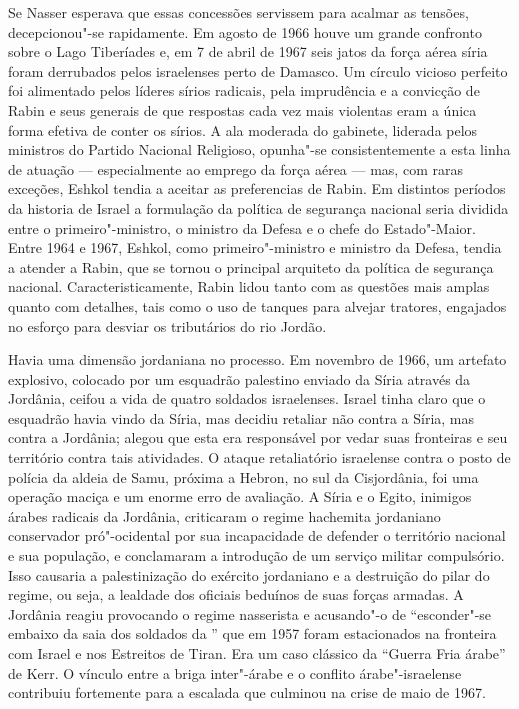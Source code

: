 Se Nasser esperava que essas concessões servissem para acalmar as
tensões, decepcionou"-se rapidamente. Em agosto de 1966 houve um grande
confronto sobre o Lago Tiberíades e, em 7 de abril de 1967 seis jatos da
força aérea síria foram derrubados pelos israelenses perto de Damasco.
Um círculo vicioso perfeito foi alimentado pelos líderes sírios
radicais, pela imprudência e a convicção de Rabin e seus generais de que
respostas cada vez mais violentas eram a única forma efetiva de conter
os sírios. A ala moderada do gabinete, liderada pelos ministros do
Partido Nacional Religioso, opunha"-se consistentemente a esta linha de
atuação --- especialmente ao emprego da força aérea --- mas, com raras
exceções, Eshkol tendia a aceitar as preferencias de Rabin. Em distintos
períodos da historia de Israel a formulação da política de segurança
nacional seria dividida entre o primeiro"-ministro, o ministro da Defesa
e o chefe do Estado"-Maior. Entre 1964 e 1967, Eshkol, como primeiro"-ministro 
e ministro da Defesa, tendia a atender a Rabin, que se tornou o
principal arquiteto da política de segurança nacional.
Caracteristicamente, Rabin lidou tanto com as questões mais amplas
quanto com detalhes, tais como o uso de tanques para alvejar tratores,
engajados no esforço para desviar os tributários do rio Jordão.

Havia uma dimensão jordaniana no processo. Em novembro de 1966, um
artefato explosivo, colocado por um esquadrão palestino enviado da Síria
através da Jordânia, ceifou a vida de quatro soldados israelenses.
Israel tinha claro que o esquadrão havia vindo da Síria, mas decidiu
retaliar não contra a Síria, mas contra a Jordânia; alegou que esta era
responsável por vedar suas fronteiras e seu território contra tais
atividades. O ataque retaliatório israelense contra o posto de polícia
da aldeia de Samu, próxima a Hebron, no sul da Cisjordânia, foi uma
operação maciça e um enorme erro de avaliação. A Síria e o Egito,
inimigos árabes radicais da Jordânia, criticaram o regime hachemita
jordaniano conservador pró"-ocidental por sua incapacidade de defender o
território nacional e sua população, e conclamaram a introdução de um
serviço militar compulsório. Isso causaria a palestinização do exército
jordaniano e a destruição do pilar do regime, ou seja, a lealdade dos
oficiais beduínos de suas forças armadas. A Jordânia reagiu provocando o
regime nasserista e acusando"-o de ``esconder"-se embaixo da saia dos
soldados da '' que em 1957 foram estacionados na fronteira com Israel
e nos Estreitos de Tiran. Era um caso clássico da ``Guerra Fria árabe''
de Kerr. O vínculo entre a briga inter"-árabe e o conflito
árabe"-israelense contribuiu fortemente para a escalada que culminou na
crise de maio de 1967.

